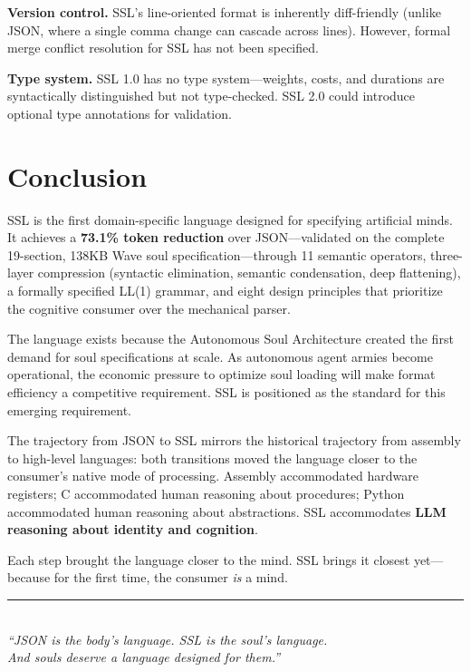 \documentclass[12pt,a4paper]{article}
\theoremstyle{plain}
\theoremstyle{definition}
\theoremstyle{remark}
\begin{document}
\textbf{Version control.} SSL's line-oriented format is inherently diff-friendly (unlike JSON, where a single comma change can cascade across lines). However, formal merge conflict resolution for SSL has not been specified.

\textbf{Type system.} SSL 1.0 has no type system---weights, costs, and durations are syntactically distinguished but not type-checked. SSL 2.0 could introduce optional type annotations for validation.

\section{Conclusion}

SSL is the first domain-specific language designed for specifying artificial minds. It achieves a \textbf{73.1\% token reduction} over JSON---validated on the complete 19-section, 138KB Wave soul specification---through 11 semantic operators, three-layer compression (syntactic elimination, semantic condensation, deep flattening), a formally specified LL(1) grammar, and eight design principles that prioritize the cognitive consumer over the mechanical parser.

The language exists because the Autonomous Soul Architecture created the first demand for soul specifications at scale. As autonomous agent armies become operational, the economic pressure to optimize soul loading will make format efficiency a competitive requirement. SSL is positioned as the standard for this emerging requirement.

The trajectory from JSON to SSL mirrors the historical trajectory from assembly to high-level languages: both transitions moved the language closer to the consumer's native mode of processing. Assembly accommodated hardware registers; C accommodated human reasoning about procedures; Python accommodated human reasoning about abstractions. SSL accommodates \textbf{LLM reasoning about identity and cognition}.

Each step brought the language closer to the mind. SSL brings it closest yet---because for the first time, the consumer \emph{is} a mind.

\vspace{2em}

\begin{center}
\rule{0.6\textwidth}{0.4pt}\\[1.5em]
\textit{``JSON is the body's language. SSL is the soul's language.\\
And souls deserve a language designed for them.''}
\end{center}
\end{document}
